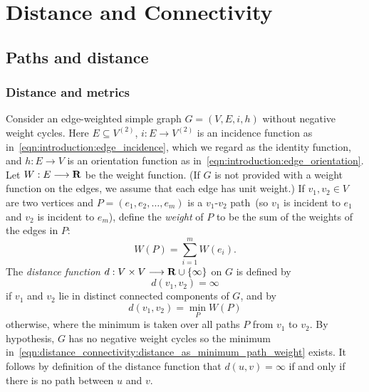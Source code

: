 
\chapter{Distance and Connectivity}
\label{chap:distance_connectivity}



\section{Paths and distance}



\subsection{Distance and metrics}

Consider an edge-weighted simple graph $G = (V,E,i,h)$ without
negative weight cycles. Here $E \subseteq V^{(2)}$, $i: E \to V^{(2)}$
is an incidence function as in~\eqref{eqn:introduction:edge_incidence},
which we regard as the identity function, and $h: E \to V$ is an
orientation function as in~\eqref{eqn:introduction:edge_orientation}.
Let $W: E \longrightarrow \mathbf{R}$ be the weight function. (If $G$ is not provided with
a weight function on the edges, we assume that each edge has unit
weight.) If $v_1, v_2 \in V$ are two vertices and
$P = (e_1, e_2, \dots, e_m)$ is a $v_1$-$v_2$ path~(so $v_1$ is
incident to $e_1$ and $v_2$ is incident to $e_m$), define the
\emph{weight} of $P$ to be the sum of the weights
of the edges in $P$:
\[
W(P)
=
\sum_{i=1}^m W(e_i).
\]
The \emph{distance function}
$d: V \times V \longrightarrow \mathbf{R} \cup \{\infty\}$ on $G$ is defined by
\[
d(v_1, v_2)
=
\infty
\]
if $v_1$ and $v_2$ lie in distinct connected components of $G$, and by
\begin{equation}
\label{eqn:distance_connectivity:distance_as_minimum_path_weight}
d(v_1, v_2)
=
\min_P W(P)
\end{equation}
otherwise, where the minimum is taken over all paths $P$ from $v_1$ to
$v_2$. By hypothesis, $G$ has no negative weight cycles so the minimum
in~\eqref{eqn:distance_connectivity:distance_as_minimum_path_weight}
exists. It follows by definition of the distance function that
$d(u,v) = \infty$ if and only if there is no path between $u$ and $v$.

